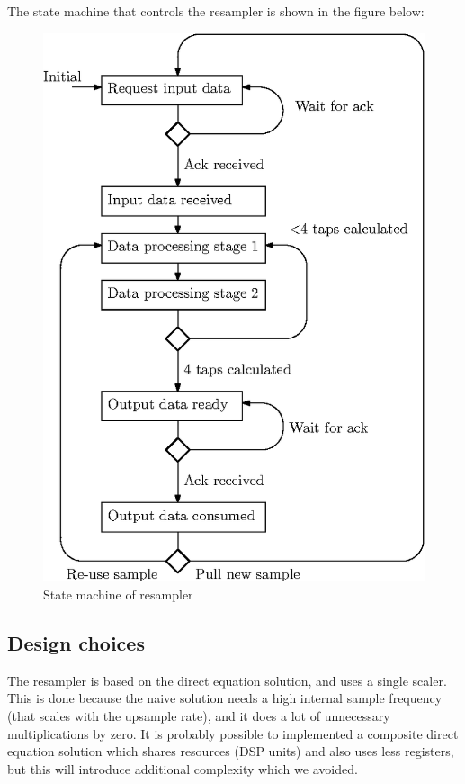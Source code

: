 \documentclass[a4paper,twoside,11pt, fleqn]{article}
\begin{document}
\newpage
The state machine that controls the resampler is shown in the figure below:
\begin{figure}[h]
	\includegraphics[scale = 1]{Images/4_statemachine}
    \caption{State machine of resampler}
\end{figure}




\newpage
\subsection{Design choices}
The resampler is based on the direct equation solution, and uses a single scaler. This is done because the naive solution needs a high internal sample frequency (that scales  with the upsample rate), and it does a lot of unnecessary multiplications by zero. It is probably possible to implemented a composite direct equation solution which shares resources (DSP units) and also uses less registers, but this will introduce additional complexity which we avoided.\\
\end{document}
